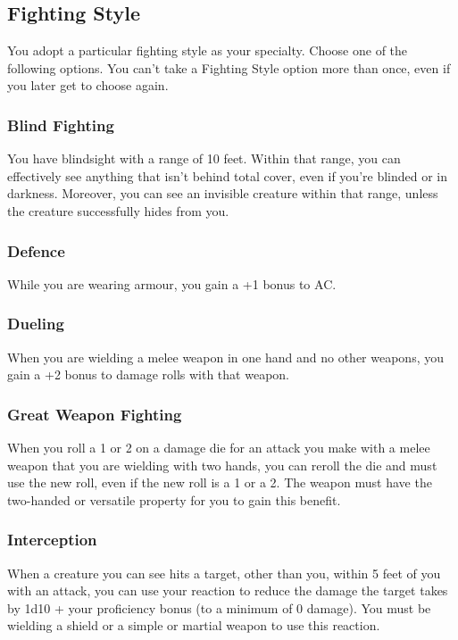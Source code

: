 \subsection{Fighting Style}
You adopt a particular fighting style as your specialty.
Choose one of the following options.
You can't take a Fighting Style option more than once,
even if you later get to choose again.

\subsubsection{Blind Fighting}
You have blindsight with a range of 10 feet.
Within that range, you can effectively see anything that
isn't behind total cover,
even if you're blinded or in darkness.
Moreover, you can see an invisible creature within that range,
unless the creature successfully hides from you.

\subsubsection{Defence}
While you are wearing armour, you gain a +1 bonus to AC.

\subsubsection{Dueling}
When you are wielding a melee weapon in one hand
and no other weapons,
you gain a +2 bonus to damage rolls with that weapon.

\subsubsection{Great Weapon Fighting}
When you roll a 1 or 2 on a damage die for an attack you make
with a melee weapon that you are wielding with two hands,
you can reroll the die and must use the new roll,
even if the new roll is a 1 or a 2.
The weapon must have the two-handed or versatile property
for you to gain this benefit.

\subsubsection{Interception}
When a creature you can see hits a target,
other than you,
within 5 feet of you with an attack,
you can use your reaction to reduce the damage the target takes
by 1d10 + your proficiency bonus (to a minimum of 0 damage).
You must be wielding a shield or a simple or martial weapon
to use this reaction.


